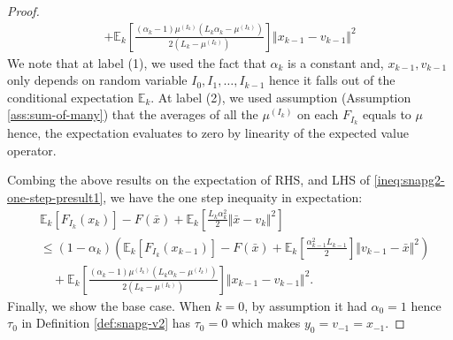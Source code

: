 \documentclass[12pt]{article}
\begin{document}
\begin{proof}
{\begin{align*}
                    + \mathbb E_k\left[
                        \frac{(\alpha_k - 1)\mu^{(I_k)}\left(L_k\alpha_k - \mu^{(I_k)}\right)}{2\left(L_k - \mu^{(I_k)}\right)}
                    \right]\Vert x_{k - 1} - v_{k - 1} \Vert^2
            \end{align*}
            }
            We note that at label (1), we used the fact that $\alpha_k$ is a constant and, $x_{k - 1}, v_{k - 1}$ only depends on random variable $I_0, I_1, \ldots, I_{k - 1}$ hence it falls out of the conditional expectation $\mathbb E_k$. 
            At label (2), we used assumption (Assumption \ref{ass:sum-of-many}) that the averages of all the $\mu^{(I_k)}$ on each $F_{I_k}$ equals to $\mu$ hence, the expectation evaluates to zero by linearity of the expected value operator. 
            \par
            Combing the above results on the expectation of RHS, and LHS of \eqref{ineq:snapg2-one-step-presult1}, we have the one step inequaity in expectation: 
            \begin{align*}
                & \mathbb E_k\left[F_{I_k}(x_{k})\right] 
                - F(\bar x) 
                + \mathbb E_k\left[
                    \frac{L_k\alpha_k^2}{2}\Vert \bar x - v_k\Vert^2 
                \right]
                \\
                &\le 
                (1 - \alpha_k)\left(
                        \mathbb E_k \left[F_{I_k}(x_{k - 1})\right] 
                        - F(\bar x)
                        + \mathbb E_k \left[\frac{\alpha_{k - 1}^2L_{k - 1}}{2}\right]\Vert v_{k - 1} - \bar x\Vert^2
                \right)
                    \\ &\quad 
                    + \mathbb E_k\left[
                        \frac{(\alpha_k - 1)\mu^{(I_k)}\left(L_k\alpha_k - \mu^{(I_k)}\right)}{2\left(L_k - \mu^{(I_k)}\right)}
                    \right]\Vert x_{k - 1} - v_{k - 1} \Vert^2. 
            \end{align*}
            Finally, we show the base case. 
            When $k = 0$, by assumption it had $\alpha_0 = 1$ hence $\tau_0$ in Definition \ref{def:snapg-v2} has $\tau_0 = 0$ which makes $y_0 = v_{- 1} = x_{-1}$. 


\end{proof}
\end{document}

